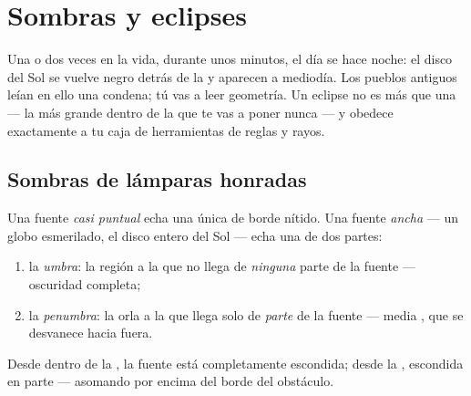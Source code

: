 \chapter{Sombras y eclipses}\label{ch:g7:shadows-eclipses}

Una o dos veces en la vida, durante unos minutos, el día se hace
noche: el disco del Sol se vuelve negro detrás de la  y
aparecen  a mediodía. Los pueblos antiguos leían en ello una
condena; tú vas a leer geometría. Un eclipse no es más que una
 --- la  más grande dentro de la que te vas a
poner nunca --- y obedece exactamente a tu caja de herramientas de
reglas y rayos.

\section{Sombras de lámparas honradas}

\begin{proposition}\label{prop:g7:shadows-eclipses:umbra}
Una fuente \emph{casi puntual} echa una única  de borde
nítido. Una fuente \emph{ancha} --- un globo esmerilado, el disco
entero del Sol --- echa una  de dos partes:
\begin{enumerate}
  \item la \emph{umbra}: la región a la que no llega
         de \emph{ninguna} parte de la fuente --- oscuridad
        completa;
  \item la \emph{penumbra}: la orla a la que llega
         solo de \emph{parte} de la fuente --- media
        , que se desvanece hacia fuera.
\end{enumerate}
Desde dentro de la , la fuente está completamente escondida;
desde la , escondida en parte --- asomando por encima del
borde del obstáculo.
\end{proposition}

